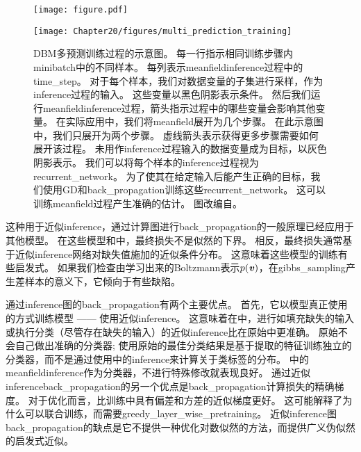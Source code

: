 \begin{figure}[!htb]
\ifOpenSource
\centerline{\texttt{[image: figure.pdf]}}
\else
\centerline{\texttt{[image: Chapter20/figures/multi\_prediction\_training]}}
\fi
\caption{\gls{DBM}多预测训练过程的示意图。
每一行指示相同训练步骤内\gls{minibatch}中的不同样本。
每列表示\gls{meanfield}\gls{inference}过程中的\gls{time_step}。
对于每个样本，我们对数据变量的子集进行采样，作为\gls{inference}过程的输入。
这些变量以黑色阴影表示条件。
然后我们运行\gls{meanfield}\gls{inference}过程，箭头指示过程中的哪些变量会影响其他变量。
在实际应用中，我们将\gls{meanfield}展开为几个步骤。
在此示意图中，我们只展开为两个步骤。
虚线箭头表示获得更多步骤需要如何展开该过程。
未用作\gls{inference}过程输入的数据变量成为目标，以灰色阴影表示。
我们可以将每个样本的\gls{inference}过程视为\gls{recurrent_network}。
为了使其在给定输入后能产生正确的目标，我们使用\gls{GD}和\gls{back_propagation}训练这些\gls{recurrent_network}。
这可以训练\gls{meanfield}过程产生准确的估计。
图改编自\citet{Goodfellow-et-al-NIPS2013}。
}
\label{fig:chap20_multi_prediction_training}
\end{figure}

这种用于近似\gls{inference}，通过计算图进行\gls{back_propagation}的一般原理已经应用于其他模型\citep{Stoyanov2011,brakel13a}。
在这些模型和中，最终损失不是似然的下界。
相反，最终损失通常基于近似\gls{inference}网络对缺失值施加的近似条件分布。
这意味着这些模型的训练有些启发式。
如果我们检查由学习出来的\gls{Boltzmann}表示$p(\boldsymbol{\mathit{v}})$，在\gls{gibbs_sampling}产生差样本的意义下，它倾向于有些缺陷。

通过\gls{inference}图的\gls{back_propagation}有两个主要优点。
首先，它以模型真正使用的方式训练模型 —— 使用近似\gls{inference}。
这意味着在中，进行如填充缺失的输入或执行分类（尽管存在缺失的输入）的近似\gls{inference}比在原始中更准确。
原始不会自己做出准确的分类器; 使用原始的最佳分类结果是基于提取的特征训练独立的分类器，而不是通过使用中的\gls{inference}来计算关于类标签的分布。
中的\gls{meanfield}\gls{inference}作为分类器，不进行特殊修改就表现良好。
通过近似\gls{inference}\gls{back_propagation}的另一个优点是\gls{back_propagation}计算损失的精确梯度。
对于优化而言，比训练中具有偏差和方差的近似梯度更好。
这可能解释了为什么可以联合训练，而需要\gls{greedy_layer_wise_pretraining}。
近似\gls{inference}图\gls{back_propagation}的缺点是它不提供一种优化对数似然的方法，而提供广义伪似然的启发式近似。

